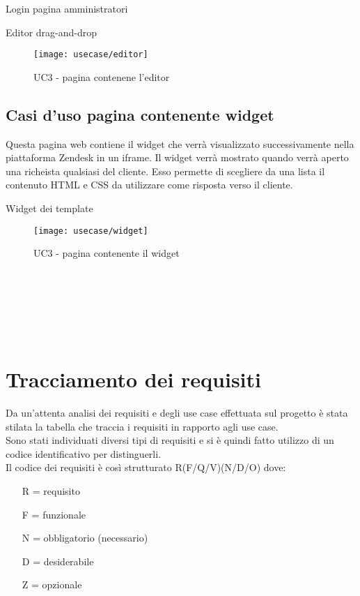 \begin{usecase}{1}{Login pagina amministratori}
\begin{usecase}{3}{Editor drag-and-drop}
	\begin{figure}[!h] 
		\centering 
		\texttt{[image: usecase/editor]} 
		\caption{UC3 - pagina contenene l'editor}
	\end{figure}
\end{usecase}
\newpage
\subsection{ Casi d'uso pagina contenente widget}
Questa pagina web contiene il widget che verrà visualizzato successivamente nella piattaforma Zendesk in un iframe. Il widget verrà mostrato quando verrà aperto una richeista qualsiasi del cliente. Esso permette di scegliere da una lista il contenuto HTML e CSS da utilizzare come risposta verso il cliente. 
\begin{usecase}{4}{Widget dei template}
	
	\begin{figure}[!h] 
		\centering 
		\texttt{[image: usecase/widget]} 
		\caption{UC3 - pagina contenente il widget}
	\end{figure}
\\
\\
\\
\\
\\
\end{usecase}

\section{Tracciamento dei requisiti}

Da un'attenta analisi dei requisiti e degli use case effettuata sul progetto è stata stilata la tabella che traccia i requisiti in rapporto agli use case.\\
Sono stati individuati diversi tipi di requisiti e si è quindi fatto utilizzo di un codice identificativo per distinguerli.\\
Il codice dei requisiti è così strutturato R(F/Q/V)(N/D/O) dove:
\begin{enumerate}
	\item[R =] requisito
    \item[F =] funzionale
    \item[N =] obbligatorio (necessario)
    \item[D =] desiderabile
    \item[Z =] opzionale
\end{enumerate}


\end{usecase}
